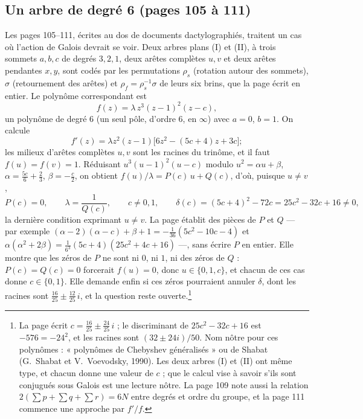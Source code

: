 \documentclass[11pt,a4paper]{article}
\begin{document}
\subsection*{Un arbre de degré 6 (pages 105 à 111)}

Les pages 105--111, écrites au dos de documents dactylographiés, traitent un
cas où l'action de Galois devrait se voir. Deux arbres plans (I) et (II), à
trois sommets $a, b, c$ de degrés $3, 2, 1$, deux arêtes complètes $u, v$ et deux
arêtes pendantes $x, y$, sont codés par les permutations $\rho_{s}$ (rotation
autour des sommets), $\sigma$ (retournement des arêtes) et $\rho_{f} =
\rho_{s}^{-1}\sigma$ de leurs six brins, que la page écrit en entier. Le
polynôme correspondant est
\[
f(z) = \lambda\, z^{3}(z-1)^{2}(z - c),
\]
un polynôme de degré $6$ (un seul pôle, d'ordre $6$, en $\infty$) avec $a = 0$,
$b = 1$. On calcule
\[
f'(z) = \lambda z^{2}(z-1)\bigl[6z^{2} - (5c+4)z + 3c\bigr] ;
\]
les milieux d'arêtes complètes $u, v$ sont les racines du trinôme, et il faut
$f(u) = f(v) = 1$. Réduisant $u^{3}(u-1)^{2}(u-c)$ modulo $u^{2} = \alpha u +
\beta$, $\alpha = \tfrac{5c}{6} + \tfrac23$, $\beta = -\tfrac{c}{2}$, on obtient
$f(u)/\lambda = P(c)\, u + Q(c)$, d'où, puisque $u \neq v$,
\[
P(c) = 0, \qquad \lambda = \frac{1}{Q(c)}, \qquad c \neq 0, 1, \qquad
\delta(c) = (5c+4)^{2} - 72c = 25c^{2} - 32c + 16 \neq 0,
\]
la dernière condition exprimant $u \neq v$. La page établit des pièces de
$P$ et $Q$ --- par exemple $(\alpha - 2)(\alpha - c) + \beta + 1 =
-\tfrac{1}{36}(5c^{2} - 10c - 4)$ et $\alpha(\alpha^{2} + 2\beta) =
\tfrac{1}{6^{3}}(5c+4)(25c^{2} + 4c + 16)$ ---, sans écrire $P$ en entier. Elle
montre que les zéros de $P$ ne sont ni $0$, ni $1$, ni des zéros de $Q$ :
$P(c) = Q(c) = 0$ forcerait $f(u) = 0$, donc $u \in \{0, 1, c\}$, et chacun de
ces cas donne $c \in \{0, 1\}$. Elle demande enfin si ces zéros pourraient
annuler $\delta$, dont les racines sont $\tfrac{16}{25} \pm \tfrac{12}{25}\, i$,
et la question reste ouverte.\footnote{La page écrit $c = \tfrac{16}{25} \pm
\tfrac{24}{25}\, i$ ; le discriminant de $25c^{2} - 32c + 16$ est $-576 =
-24^{2}$, et les racines sont $(32 \pm 24i)/50$. Nom nôtre pour ces
polynômes : « polynômes de Chebyshev généralisés » ou de Shabat (G.~Shabat
et V.~Voevodsky, 1990). Les deux arbres (I) et (II) ont même type, et chacun
donne une valeur de $c$ ; que le calcul vise à savoir s'ils sont conjugués sous
Galois est une lecture nôtre. La page 109 note aussi la relation $2(\sum p + \sum q + \sum r) = 6N$ entre
degrés et ordre du groupe, et la page 111 commence une approche par
$f'/f$.}
\end{document}
